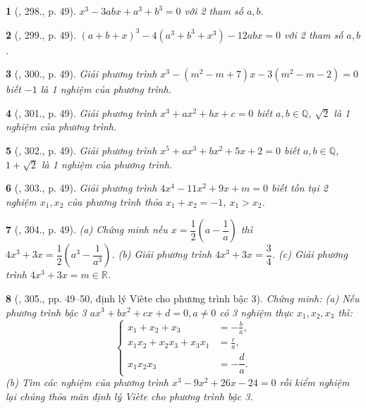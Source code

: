 \documentclass{article}
\newtheorem{baitoan}{}
\begin{document}
\begin{baitoan}[\cite{Binh_Toan_9_tap_2}, 298., p. 49]
	$x^3 - 3abx + a^3 + b^3 = 0$ với 2 tham số $a,b$.
\end{baitoan}

\begin{baitoan}[\cite{Binh_Toan_9_tap_2}, 299., p. 49]
	$(a + b + x)^3 - 4(a^3 + b^3 + x^3) - 12abx = 0$ với 2 tham số $a,b$.
\end{baitoan}

\begin{baitoan}[\cite{Binh_Toan_9_tap_2}, 300., p. 49]
	Giải phương trình $x^3 - (m^2 - m + 7)x - 3(m^2 - m - 2) = 0$ biết $-1$ là 1 nghiệm của phương trình.
\end{baitoan}

\begin{baitoan}[\cite{Binh_Toan_9_tap_2}, 301., p. 49]
	Giải phương trình $x^3 + ax^2 + bx + c = 0$ biết $a,b\in\mathbb{Q}$, $\sqrt{2}$ là 1 nghiệm của phương trình.
\end{baitoan}

\begin{baitoan}[\cite{Binh_Toan_9_tap_2}, 302., p. 49]
	Giải phương trình $x^5 + ax^3 + bx^2 + 5x + 2 = 0$ biết $a,b\in\mathbb{Q}$, $1 + \sqrt{2}$ là 1 nghiệm của phương trình.
\end{baitoan}

\begin{baitoan}[\cite{Binh_Toan_9_tap_2}, 303., p. 49]
	Giải phương trình $4x^4 - 11x^2 + 9x + m = 0$ biết tồn tại 2 nghiệm $x_1,x_2$ của phương trình thỏa $x_1 + x_2 = -1$, $x_1 > x_2$.
\end{baitoan}

\begin{baitoan}[\cite{Binh_Toan_9_tap_2}, 304., p. 49]
	(a) Chứng minh nếu $x = \dfrac{1}{2}\left(a - \dfrac{1}{a}\right)$ thì $4x^3 + 3x = \dfrac{1}{2}\left(a^3 - \dfrac{1}{a^3}\right)$. (b) Giải phương trình $4x^3 + 3x = \dfrac{3}{4}$. (c) Giải phương trình $4x^3 + 3x = m\in\mathbb{R}$.
\end{baitoan}

\begin{baitoan}[\cite{Binh_Toan_9_tap_2}, 305., pp. 49--50, định lý Vi\`ete cho phương trình bậc 3]
	Chứng minh: (a) Nếu phương trình bậc 3 $ax^3 + bx^2 + cx + d = 0,a\ne0$ có 3 nghiệm thực $x_1,x_2,x_3$ thì:
	\begin{equation*}
		\left\{\begin{split}
			x_1 + x_2 + x_3 &= -\frac{b}{a},\\
			x_1x_2 + x_2x_3 + x_3x_1 &= \frac{c}{a},\\
			x_1x_2x_3 &= -\dfrac{d}{a}.
		\end{split}\right.
	\end{equation*}
	(b) Tìm các nghiệm của phương trình $x^3 - 9x^2 + 26x - 24 = 0$ rồi kiểm nghiệm lại chúng thỏa mãn định lý Vi\`ete cho phương trình bậc 3.
\end{baitoan}
\end{document}
